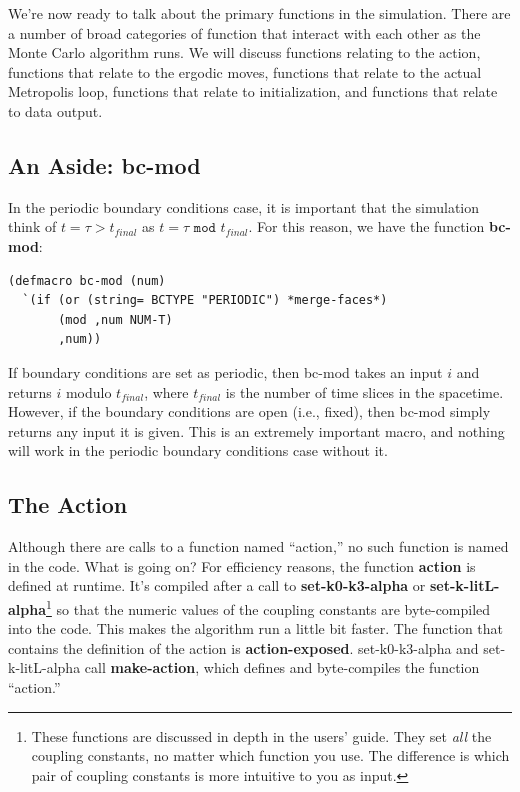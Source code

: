 \documentclass[12pt]{article}
\begin{document}
We're now ready to talk about the primary functions in the
simulation. There are a number of broad categories of function that
interact with each other as the Monte Carlo algorithm runs. We will
discuss functions relating to the action, functions that relate to the
ergodic moves, functions that relate to the actual Metropolis loop,
functions that relate to initialization, and functions that relate to
data output.

\subsection{An Aside: bc-mod}

In the periodic boundary conditions case, it is important that the
simulation think of $t = \tau > t_{final}$ as $t = \tau \texttt{ mod }
t_{final}$. For this reason, we have the function \textbf{bc-mod}:
\begin{lstlisting}
(defmacro bc-mod (num)
  `(if (or (string= BCTYPE "PERIODIC") *merge-faces*)
       (mod ,num NUM-T)
       ,num))
\end{lstlisting}
If boundary conditions are set as periodic, then bc-mod takes an input
$i$ and returns $i$ modulo $t_{final}$, where $t_{final}$ is the
number of time slices in the spacetime. However, if the boundary
conditions are open (i.e., fixed), then bc-mod simply returns any
input it is given. This is an extremely important macro, and nothing
will work in the periodic boundary conditions case without it.

\subsection{The Action}

Although there are calls to a function named ``action,'' no such
function is named in the code. What is going on? For efficiency
reasons, the function \textbf{action} is defined at runtime. It's
compiled after a call to \textbf{set-k0-k3-alpha} or
\textbf{set-k-litL-alpha}\footnote{These functions are discussed in
  depth in the users' guide. They set \textit{all} the coupling
  constants, no matter which function you use. The difference is which
  pair of coupling constants is more intuitive to you as input.} so
that the numeric values of the coupling constants are byte-compiled
into the code. This makes the algorithm run a little bit faster. The
function that contains the definition of the action is
\textbf{action-exposed}. set-k0-k3-alpha and set-k-litL-alpha call
\textbf{make-action}, which defines and byte-compiles the function
``action.''
\end{document}
